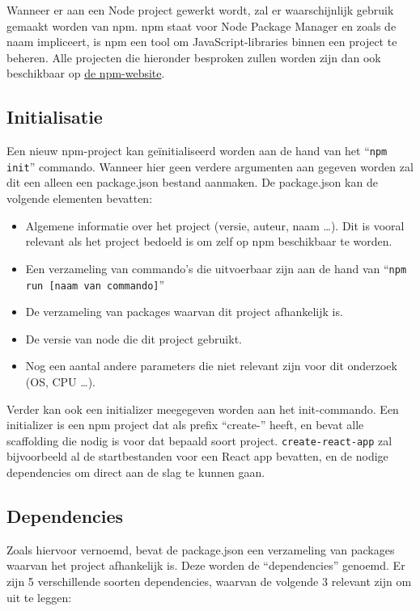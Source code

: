 Wanneer er aan een Node project gewerkt wordt, zal er waarschijnlijk gebruik gemaakt worden van npm. npm staat voor Node Package Manager en zoals de naam impliceert, is npm een tool om JavaScript-libraries binnen een project te beheren. Alle projecten die hieronder besproken zullen worden zijn dan ook beschikbaar op \href{https://www.npmjs.com/}{de npm-website}.

\subsection{Initialisatie}

Een nieuw npm-project kan geïnitialiseerd worden aan de hand van het ``\lstinline{npm init}'' commando. Wanneer hier geen verdere argumenten aan gegeven worden zal dit een alleen een package.json bestand aanmaken. De package.json kan de volgende elementen bevatten: \autocite{npmDocsPackageJson}

\begin{itemize}
    \item Algemene informatie over het project (versie, auteur, naam \ldots). Dit is vooral relevant als het project bedoeld is om zelf op npm beschikbaar te worden.
    \item Een verzameling van commando's die uitvoerbaar zijn aan de hand van ``\lstinline{npm run [naam van commando]}''
    \item De verzameling van packages waarvan dit project afhankelijk is.
    \item De versie van node die dit project gebruikt.
    \item Nog een aantal andere parameters die niet relevant zijn voor dit onderzoek (OS, CPU \ldots).
\end{itemize}

Verder kan ook een initializer meegegeven worden aan het init-commando. Een initializer is een npm project dat als prefix ``create-'' heeft, en bevat alle scaffolding die nodig is voor dat bepaald soort project. \lstinline{create-react-app} zal bijvoorbeeld al de startbestanden voor een React app bevatten, en de nodige dependencies om direct aan de slag te kunnen gaan.

\subsection{Dependencies}

Zoals hiervoor vernoemd, bevat de package.json een verzameling van packages waarvan het project afhankelijk is. Deze worden de ``dependencies'' genoemd. Er zijn 5 verschillende soorten dependencies, waarvan de volgende 3 relevant zijn om uit te leggen:

